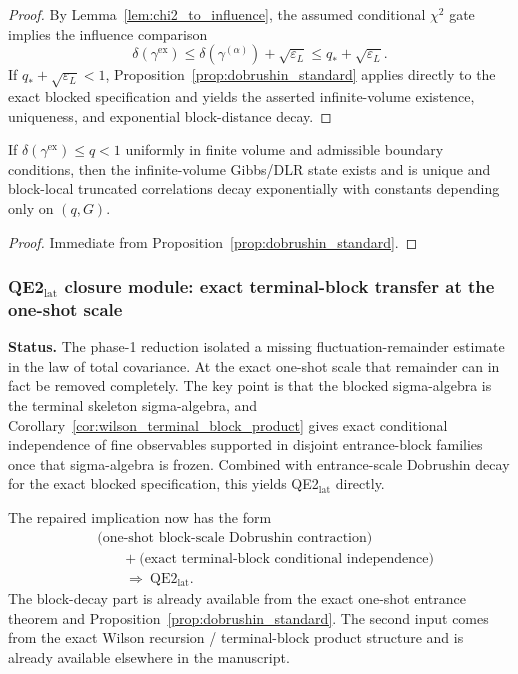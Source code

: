 \begin{proof}
By Lemma~\ref{lem:chi2_to_influence}, the assumed conditional $\chi^2$ gate implies the influence comparison
\[
\delta(\gamma^{\mathrm{ex}})
\le
\delta(\gamma^{(\alpha)})+\sqrt{\varepsilon_L}
\le q_*+\sqrt{\varepsilon_L}.
\]
If $q_*+\sqrt{\varepsilon_L}<1$, Proposition~\ref{prop:dobrushin_standard} applies directly to the exact blocked specification and yields the asserted infinite-volume existence, uniqueness, and exponential block-distance decay.
\end{proof}

\begin{corollary}\label{cor:IV_uniqueness_uniformity}
If $\delta(\gamma^{\mathrm{ex}})\le q<1$ uniformly in finite volume and admissible boundary conditions, then the infinite-volume Gibbs/DLR state exists and is unique and block-local truncated correlations decay exponentially with constants depending only on $(q,G)$.
\end{corollary}

\begin{proof}
Immediate from Proposition~\ref{prop:dobrushin_standard}.
\end{proof}

\subsubsection{QE2$_{\mathrm{lat}}$ closure module: exact terminal-block transfer at the one-shot scale}

\medskip
\noindent
\textbf{Status.}
The phase-1 reduction isolated a missing fluctuation-remainder estimate in the law of total covariance.
At the exact one-shot scale that remainder can in fact be removed completely.
The key point is that the blocked sigma-algebra is the terminal skeleton sigma-algebra, and Corollary~\ref{cor:wilson_terminal_block_product} gives exact conditional independence of fine observables supported in disjoint entrance-block families once that sigma-algebra is frozen.
Combined with entrance-scale Dobrushin decay for the exact blocked specification, this yields QE2$_{\mathrm{lat}}$ directly.

\medskip
\noindent
The repaired implication now has the form
\[
\begin{aligned}
&\text{(one-shot block-scale Dobrushin contraction)}\\
&\qquad +\ \text{(exact terminal-block conditional independence)}\\
&\qquad \Longrightarrow\ \text{QE2$_{\mathrm{lat}}$}.
\end{aligned}
\]
The block-decay part is already available from the exact one-shot entrance theorem and Proposition~\ref{prop:dobrushin_standard}.
The second input comes from the exact Wilson recursion / terminal-block product structure and is already available elsewhere in the manuscript.

